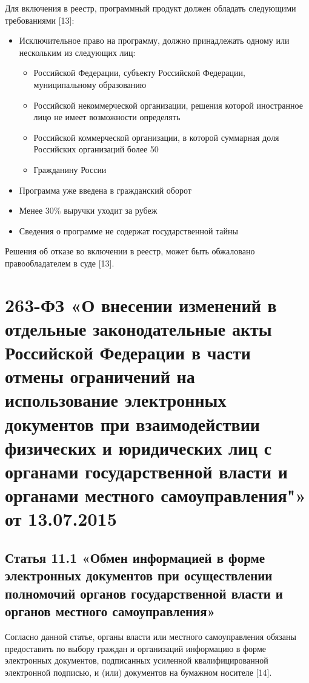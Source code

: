 \documentclass[14pt,a4paper,report]{article}
\begin{document}
Для включения в реестр, программный продукт должен обладать следующими требованиями [13]:

\begin{itemize}
	\item Исключительное право на программу, должно принадлежать одному или нескольким из следующих лиц:
	
	\begin{itemize}
		\item Российской Федерации, субъекту Российской Федерации, муниципальному образованию
		\item Российской некоммерческой организации, решения которой иностранное лицо не имеет возможности определять
		\item Российской коммерческой организации, в которой суммарная доля Российских организаций более 50%
		\item Гражданину России
	\end{itemize}
	
	\item Программа уже введена в гражданский оборот
	\item Менее 30\% выручки уходит за рубеж
	\item Сведения о программе не содержат государственной тайны
\end{itemize}

Решения об отказе во включении в реестр, может быть обжаловано правообладателем в суде [13].

\section{263-ФЗ «О внесении изменений в отдельные законодательные акты Российской Федерации в части отмены ограничений на использование электронных документов при взаимодействии физических и юридических лиц с органами государственной власти и органами местного самоуправления"» от 13.07.2015}

\subsection{Статья 11.1 «Обмен информацией в форме электронных документов при осуществлении полномочий органов государственной власти и органов местного самоуправления»}

Согласно данной статье, органы власти или местного самоуправления обязаны предоставить по выбору граждан и организаций информацию в форме электронных документов, подписанных усиленной квалифицированной электронной подписью, и (или) документов на бумажном носителе [14].
\end{document}
